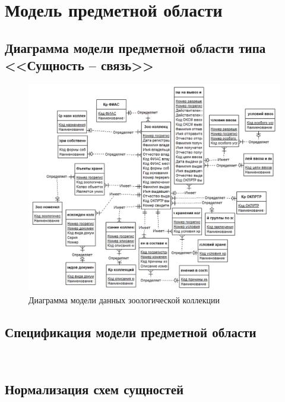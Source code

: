 \documentclass[10pt, a4paper, titlepage]{article}
\begin{document}
\section{Модель предметной области}

\subsection{Диаграмма модели предметной области типа <<Сущность -- связь>>}

\begin{figure}[H]
    \centering
    \includegraphics[width=.9\columnwidth]{image.png}
    \caption{Диаграмма модели данных зоологической коллекции}
    \label{fig:er_diagram}
\end{figure}

\subsection{Спецификация модели предметной области}
\label{sec:specification}
{
\small
\tt
\setlength{\parindent}{.1\textwidth}

}


\subsection{Нормализация схем сущностей}
\label{sec:normalization}
\end{document}
